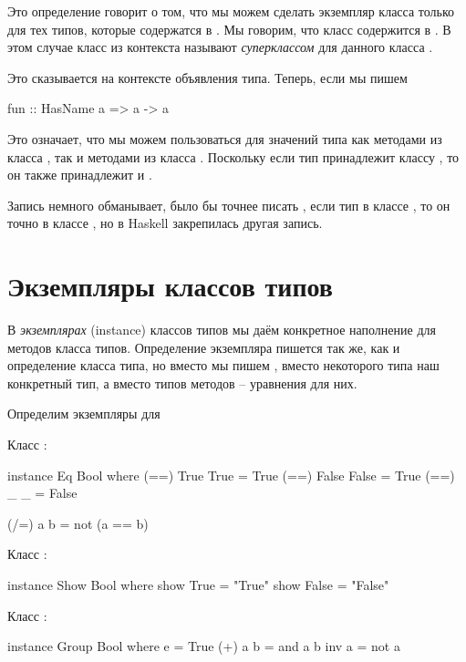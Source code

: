 Это определение говорит о том, что мы можем сделать экземпляр класса
 только для тех типов, которые содержатся в .
Мы говорим, что класс  содержится в . В этом
случае класс из контекста  называют \emph{суперклассом} для
данного класса .

Это сказывается на контексте объявления типа. Теперь, если мы пишем


\begin{code}
fun :: HasName a => a -> a
\end{code}

Это означает, что мы можем пользоваться для значений типа  как
методами из класса , так и методами из класса .
Поскольку если тип принадлежит классу , то он также
принадлежит и .

Запись  немного обманывает, было бы точнее
писать , если тип  в классе
, то он точно в классе , но в Haskell
закрепилась другая запись.

\section{Экземпляры классов типов}

В \emph{экземплярах} (instance) классов типов мы даём конкретное
наполнение для методов класса типов. Определение экземпляра пишется так
же, как и определение класса типа, но вместо  мы пишем
, вместо некоторого типа наш конкретный тип, а вместо типов
методов -- уравнения для них.

Определим экземпляры для 

Класс :


\begin{code}
instance Eq Bool where
    (==) True  True  = True
    (==) False False = True
    (==) _     _     = False

    (/=) a b         = not (a == b)
\end{code}

Класс :


\begin{code}
instance Show Bool where
    show True  = "True"
    show False = "False"
\end{code}

Класс :


\begin{code}
instance Group Bool where
    e       = True
    (+) a b = and a b
    inv a   = not a
\end{code}

